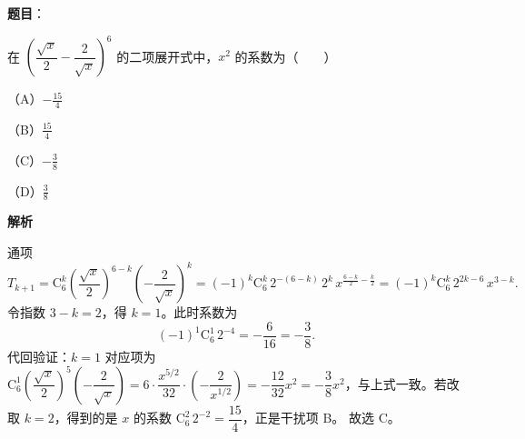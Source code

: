 \begin{answer}

\textbf{题目}：

在 $\left(\dfrac{\sqrt{x}}{2}-\dfrac{2}{\sqrt{x}}\right)^6$ 的二项展开式中，$x^2$ 的系数为\mbox{（　　）}

（A）$-\frac{15}{4}$

（B）$\frac{15}{4}$

（C）$-\frac38$

（D）$\frac38$

\textbf{解析}

通项
\nopagebreak[4]
\[T_{k+1}=\mathrm C_6^k\left(\frac{\sqrt x}{2}\right)^{6-k}\left(-\frac{2}{\sqrt x}\right)^k
=(-1)^k\mathrm C_6^k\,2^{-(6-k)}\,2^{k}\,x^{\frac{6-k}{2}-\frac k2}
=(-1)^k\mathrm C_6^k\,2^{2k-6}\,x^{3-k}.\]
令指数 $3-k=2$，得 $k=1$。此时系数为
\nopagebreak[4]
\[(-1)^1\mathrm C_6^1\,2^{-4}=-\frac{6}{16}=-\frac38.\]
代回验证：$k=1$ 对应项为 $\mathrm C_6^1\left(\dfrac{\sqrt x}{2}\right)^5\left(-\dfrac{2}{\sqrt x}\right)=6\cdot\dfrac{x^{5/2}}{32}\cdot\left(-\dfrac{2}{x^{1/2}}\right)=-\dfrac{12}{32}x^2=-\dfrac38x^2$，与上式一致。若改取 $k=2$，得到的是 $x$ 的系数 $\mathrm C_6^2\,2^{-2}=\dfrac{15}{4}$，正是干扰项 B。
故选 C。


\end{answer}
